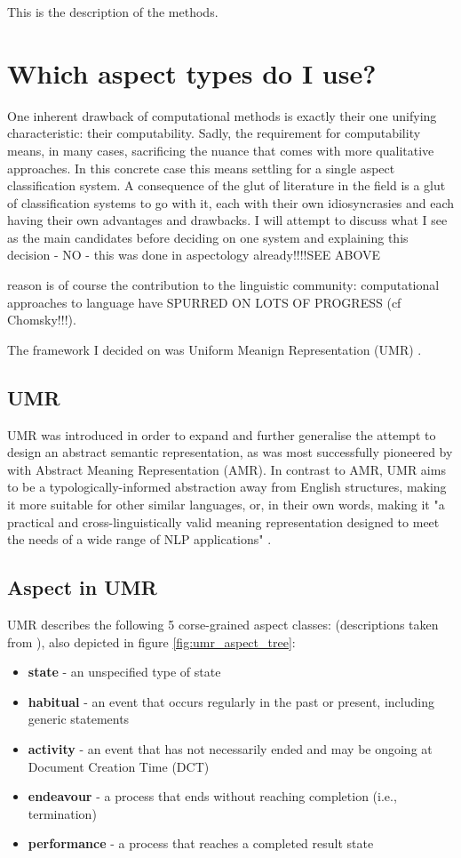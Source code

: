 This is the description of the methods. 

\section{Which aspect types do I use?}
One inherent drawback of computational methods is exactly their one unifying characteristic: their computability. Sadly, the requirement for computability means, in many cases, sacrificing the nuance that comes with more qualitative approaches. In this concrete case this means settling for a single aspect classification system. A consequence of the glut of literature in the field is a glut of classification systems to go with it, each with their own idiosyncrasies and each having their own advantages and drawbacks. I will attempt to discuss what I see as the main candidates before deciding on one system and explaining this decision - NO - this was done in aspectology already!!!!SEE ABOVE

reason is of course the contribution to the linguistic community: computational approaches to language have SPURRED ON LOTS OF PROGRESS (cf Chomsky!!!). 

The framework I decided on was Uniform Meanign Representation (UMR) \citep{umr}.

\subsection{UMR}
UMR \citep{umr} was introduced in order to expand and further generalise the attempt to design an abstract semantic representation, as was most successfully pioneered by \citet{amr} with Abstract Meaning Representation (AMR). In contrast to AMR, UMR aims to be a typologically-informed abstraction away from English structures, making it more suitable for other similar languages, or, in their own words, making it "a practical and cross-linguistically valid meaning representation designed to meet the needs of a wide range of NLP applications" \citep{umr}.


\subsection*{Aspect in UMR}
UMR describes the following 5 corse-grained aspect classes: (descriptions taken from \citet{umr}), also depicted in figure \ref{fig:umr_aspect_tree}:
\begin{itemize}
    \item \textbf{state} - an unspecified type of state
    \item \textbf{habitual} - an event that occurs regularly in the past or
    present, including generic statements
    \item \textbf{activity} - an event that has not necessarily ended and may
    be ongoing at Document Creation Time (DCT)
    \item \textbf{endeavour} - a process that ends without reaching completion
    (i.e., termination)
    \item \textbf{performance} - a process that reaches a completed result
    state
\end{itemize}

